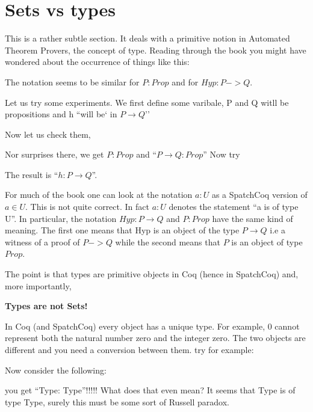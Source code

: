 \chapter{Sets vs types}\label{chap:setsvstypes}


This is a rather subtle section. It deals with a primitive notion in Automated Theorem Provers, the concept of type. Reading through the book you might have wondered about the occurrence of things like this:


The notation seems to be similar for $P:Prop$ and for $Hyp:P->Q$.

Let us try some experiments. We first define some varibale, P and Q witll be propositions and h ``will be` in $P\rightarrow Q$''


Now let us check them, 

Nor surprises there, we get $P:Prop$ and ``$P \rightarrow Q : Prop$''
Now try

The result is ``$h
     : P \rightarrow Q$''. 

 For much of the book one can look at the notation $a:U$ as a SpatchCoq version of $a\in U$. This is not quite correct. In fact $a:U$ denotes the statement ``a is of type U''. In particular, the notation $Hyp:P\rightarrow Q$ and $P:Prop$ have the same kind of meaning. The first one means that Hyp is an object of the type $P\rightarrow Q$ i.e a witness of a proof of $P->Q$ while the second means that $P$ is an object of type $Prop$.

The point is that types are primitive objects in Coq (hence in SpatchCoq) and, more importantly, 

{\bf \Large Types are not Sets!}

In Coq (and SpatchCoq) every object has a unique type. For example, 0 cannot represent both the natural number zero and the integer zero. The two objects are different and you need a conversion between them. try for example:




Now consider the following:


you get ``Type: Type''!!!!! What does that even mean? It seems that Type is of type Type, surely this must be some sort of Russell paradox.

